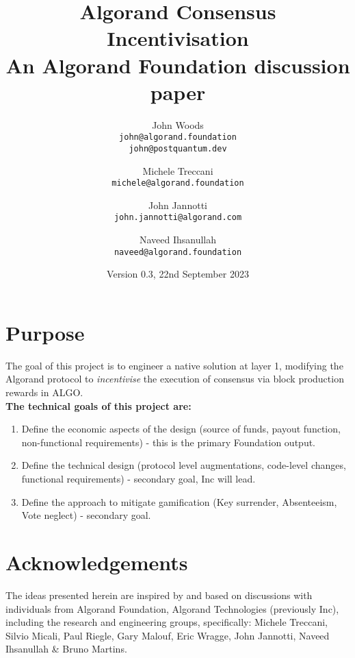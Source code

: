 \documentclass[11pt,a4paper]{article}
\begin{document}
\title {Algorand Consensus Incentivisation \\
       {\large \sc An Algorand Foundation discussion paper}}
\date  {Version 0.3, 22nd September 2023}
\author{
    John Woods \\ 
    {\small \texttt{john@algorand.foundation}} \\
    {\small \texttt{john@postquantum.dev}} \\
\and 
    Michele Treccani \\
    {\small \texttt{michele@algorand.foundation}}
\and 
    John Jannotti \\
    {\small \texttt{john.jannotti@algorand.com}}
\and 
    Naveed Ihsanullah \\
    {\small \texttt{naveed@algorand.foundation}}
}

\maketitle

\section{Purpose}
The goal of this project is to engineer a native solution at layer 1, modifying the Algorand protocol to 
\emph{incentivise} the execution of consensus via block production rewards in ALGO. \\

\textbf{The technical goals of this project are:}

\begin{enumerate}
    \item Define the economic aspects of the design (source of funds, payout function, non-functional requirements) - 
        this is the primary Foundation output.
    \item Define the technical design (protocol level augmentations, code-level changes, functional requirements) 
        - secondary goal, Inc will lead.
    \item Define the approach to mitigate gamification (Key surrender, Absenteeism, Vote neglect) - secondary goal.
\end{enumerate}

\pagebreak

\tableofcontents

\pagebreak

\section{Acknowledgements}
The ideas presented herein are inspired by and based on discussions with individuals from Algorand Foundation, 
Algorand Technologies (previously Inc), including the research and engineering groups, specifically: Michele Treccani, 
Silvio Micali, Paul Riegle, Gary Malouf, Eric Wragge, John Jannotti, Naveed Ihsanullah \& Bruno Martins.
\end{document}
